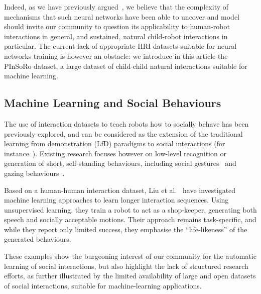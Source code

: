 \documentclass{article}
\newcommand{\etal}{et al.\xspace}
\begin{document}
Indeed, as we have previously argued~\cite{lemaignan2016towards}, we believe
that the complexity of mechanisms that such neural networks have been able to
uncover and model should invite our community to question its applicability to
human-robot interactions in general, and sustained, natural child-robot
interactions in particular. The current lack of appropriate HRI
datasets suitable for neural networks training is however an obstacle: we
introduce in this article the PInSoRo dataset, a large dataset of child-child
natural interactions suitable for machine learning.

\subsection*{Machine Learning and Social Behaviours}

The use of interaction datasets to teach robots how to socially behave has been
previously explored, and can be considered as the extension of the traditional
learning from demonstration (LfD) paradigms to social interactions (for
instance~\cite{nehaniv2007imitation,mohammad2015interaction}). Existing
research focuses however on low-level recognition or generation of short,
self-standing behaviours, including social gestures~\cite{nagai2005learning}
and gazing behaviours~\cite{calinon2006teaching}.

Based on a human-human interaction dataset, Liu \etal~\cite{liu2014how} have
investigated machine learning approaches to learn longer interaction sequences.
Using unsupervised learning, they train a robot to act as a shop-keeper,
generating both speech and socially acceptable motions. Their approach remains
task-specific, and while they report only limited success, they emphasise the
``life-likeness'' of the generated behaviours.

These examples show the burgeoning interest of our community for the automatic
learning of social interactions, but also highlight the lack of structured
research efforts, as further illustrated by the limited availability of large
and open datasets of social interactions, suitable for machine-learning
applications.
\end{document}
